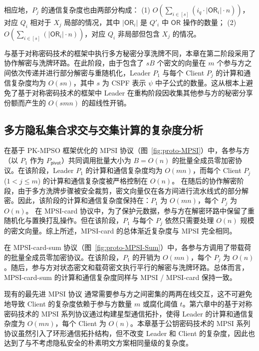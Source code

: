 相应地，$P_j$ 的通信复杂度也由两部分构成：
(1) $O(\sum_{i \in [s]}(i_q \cdot \lvert \mathsf{OR}_i \rvert \cdot n))$，对应 $Q_i$ 相对于 $X_j$ 局部的情况，其中 $\lvert \mathsf{OR}_i \rvert$ 是 $Q'_i$ 中 $\mathsf{OR}$ 操作的数量；
(2) $O(\sum_{i \in [s]}(\lvert \mathsf{OR}_i \rvert \cdot n))$，对应 $Q_i$ 非局部但包含 $X_j$ 的情况。

与基于对称密码技术的框架中执行多方秘密分享洗牌不同，本章在第二阶段采用了协作解密与洗牌环路。在此阶段，由于包含了 $sB$ 个密文的向量在 $m$ 个参与方之间依次传递并进行部分解密与重随机化，Leader $P_1$ 与每个 Client $P_j$ 的计算和通信复杂度均为 $O(sn)$，其中 $s$ 为 CSPF 表示 $\psi$ 中子公式的数量。这从根本上避免了基于对称密码技术的框架中 Leader 在重构阶段因收集其他参与方的秘密分享份额而产生的 $O(smn)$ 的超线性开销。

\subsection{多方隐私集合求交与交集计算的复杂度分析}

在基于 PK-MPSO 框架优化的 MPSI 协议（图~\ref{fig:proto-MPSI}）中，各参与方（以 $P_1$ 作为 $P_\mathsf{pivot}$）共同调用批量大小为 $B = O(n)$ 的批量全成员零加密协议。在该阶段，Leader $P_1$ 的计算和通信复杂度均为 $O(mn)$，而每个 Client $P_j$ ($1 < j \le m$) 的计算和通信复杂度被严格控制在 $O(n)$。
在随后的协作解密阶段，由于多方洗牌步骤被安全裁剪，密文向量仅在各方间进行流水线式的部分解密。因此，该阶段的计算和通信复杂度保持在：$P_1$ 为 $O(mn)$，每个 $P_j$ 为 $O(n)$。
在 MPSI-card 协议中，为了保护元数据，参与方在解密环路中保留了重随机化与置换打乱操作。但在该阶段，$P_1$ 与每个 $P_j$ 依然只需要处理 $O(n)$ 规模的密文向量。综上所述，MPSI-card 的总体渐近复杂度与 MPSI 完全相同。

在 MPSI-card-sum 协议（图~\ref{fig:proto-MPSI-Sum}）中，各参与方调用了带载荷的批量全成员零加密协议。在该阶段，$P_1$ 的开销为 $O(mn)$，每个 $P_j$ 为 $O(n)$。随后，参与方对状态密文和载荷密文执行平行的解密与洗牌环路。总体而言，MPSI-card-sum 的计算和通信复杂度同样与 MPSI / MPSI-card 保持一致。

现有的最先进 MPSI 协议 \cite{WuYC24,ChenDGB22} 通常需要参与方之间密集的两两在线交互，这不可避免地导致 Client 的复杂度依赖于参与方数量 $m$ 或腐化阈值 $t$。第六章中的基于对称密码技术的 MPSI 系列协议通过构建星型通信拓扑，使得 Leader 的计算和通信复杂度为 $O(mn)$，每个 Client 为 $O(n)$。本章基于公钥密码技术的 MPSI 系列协议虽然引入了环形通信拓扑结构，但不改变 Leader 和 Client 的复杂度，因此也达到了与不考虑隐私安全的朴素明文方案相同量级的复杂度。

